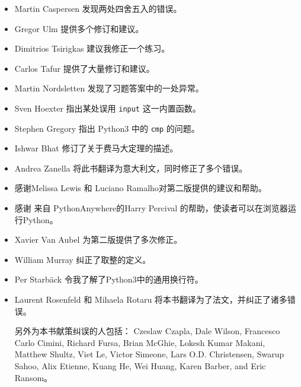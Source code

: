 \documentclass[10pt]{book}
\begin{document}
\begin{itemize}
\item Martin Caspersen 发现两处四舍五入的错误。

\item Gregor Ulm 提供多个修订和建议。

\item Dimitrios Tsirigkas  建议我修正一个练习。

\item Carlos Tafur  提供了大量修订和建议。

\item Martin Nordsletten 发现了习题答案中的一处异常。

\item Sven Hoexter 指出某处误用  {\tt input} 这一内置函数。

\item Stephen Gregory 指出 Python3 中的 {\tt cmp} 的问题。

\item Ishwar Bhat 修订了关于费马大定理的描述。

\item Andrea Zanella 将此书翻译为意大利文，同时修正了多个错误。


\item 感谢Melissa Lewis 和 Luciano Ramalho对第二版提供的建议和帮助。

\item 感谢 来自 PythonAnywhere的Harry Percival  的帮助，使读者可以在浏览器运行Python。

\item Xavier Van Aubel 为第二版提供了多次修正。

\item William Murray 纠正了取整的定义。

\item Per Starb{\"a}ck 令我了解了Python3中的通用换行符。

\item Laurent Rosenfeld 和 Mihaela Rotaru 将本书翻译为了法文，并纠正了诸多错误。


另外为本书献策纠误的人包括：
Czeslaw Czapla, Dale Wilson, Francesco Carlo Cimini,
Richard Fursa, Brian McGhie, Lokesh Kumar Makani, Matthew Shultz, Viet
Le, Victor Simeone, Lars O.D. Christensen, Swarup Sahoo, Alix Etienne,
Kuang He, Wei Huang, Karen Barber, and Eric Ransom。



\end{itemize}

\normalsize
\clearemptydoublepage
\end{document}

